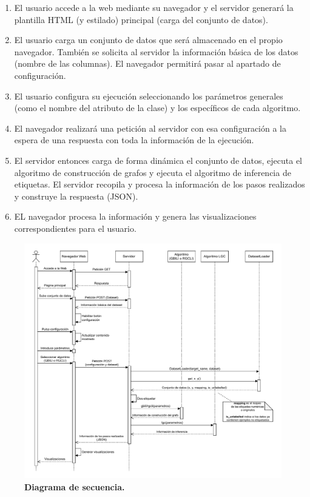 \begin{enumerate}
    \item El usuario accede a la web mediante su navegador y el servidor generará la plantilla HTML (y estilado) principal (carga del conjunto de datos).
    \item El usuario carga un conjunto de datos que será almacenado en el propio navegador. También se solicita al servidor la información básica de los datos (nombre de las columnas). El navegador permitirá pasar al apartado de configuración.
    \item El usuario configura su ejecución seleccionando los parámetros generales (como el nombre del atributo de la clase) y los específicos de cada algoritmo.
    \item El navegador realizará una petición al servidor con esa configuración a la espera de una respuesta con toda la información de la ejecución.
    \item El servidor entonces carga de forma dinámica el conjunto de datos, ejecuta el algoritmo de construcción de grafos y ejecuta el algoritmo de inferencia de etiquetas. El servidor recopila y procesa la información de los pasos realizados y construye la respuesta (JSON).
    \item EL navegador procesa la información y genera las visualizaciones correspondientes para el usuario.
\end{enumerate}

\begin{figure}[H]
		\centering
		\includegraphics[width=1\textwidth]{figuras/sec.pdf}
		\caption[Diagrama de secuencia]{\textbf{Diagrama de secuencia.}}\label{fig:sec}
\end{figure}

